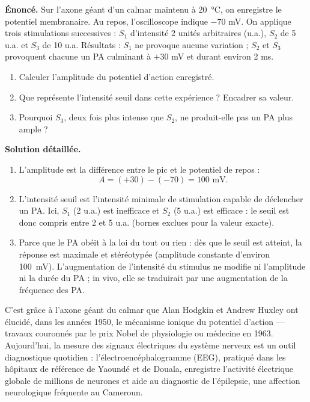\documentclass[11pt]{article}
\begin{document}
\begin{exoresolu}
\textbf{Énoncé.} Sur l'axone géant d'un calmar maintenu à \SI{20}{\celsius}, on enregistre le potentiel membranaire. Au repos, l'oscilloscope indique $-70$ mV. On applique trois stimulations successives : $S_1$ d'intensité 2 unités arbitraires (u.a.), $S_2$ de 5 u.a. et $S_3$ de 10 u.a. Résultats : $S_1$ ne provoque aucune variation ; $S_2$ et $S_3$ provoquent chacune un PA culminant à $+30$ mV et durant environ 2 ms.
\begin{enumerate}
\item Calculer l'amplitude du potentiel d'action enregistré.
\item Que représente l'intensité seuil dans cette expérience ? Encadrer sa valeur.
\item Pourquoi $S_3$, deux fois plus intense que $S_2$, ne produit-elle pas un PA plus ample ?
\end{enumerate}
\tcblower
\textbf{Solution détaillée.}
\begin{enumerate}
\item L'amplitude est la différence entre le pic et le potentiel de repos :
\[ A = (+30) - (-70) = 100 \text{ mV}. \]
\item L'intensité seuil est l'intensité minimale de stimulation capable de déclencher un PA. Ici, $S_1$ (2 u.a.) est inefficace et $S_2$ (5 u.a.) est efficace : le seuil est donc compris entre 2 et 5 u.a. (bornes exclues pour la valeur exacte).
\item Parce que le PA obéit à la loi du tout ou rien : dès que le seuil est atteint, la réponse est maximale et stéréotypée (amplitude constante d'environ \SI{100}{mV}). L'augmentation de l'intensité du stimulus ne modifie ni l'amplitude ni la durée du PA ; in vivo, elle se traduirait par une augmentation de la fréquence des PA.
\end{enumerate}
\end{exoresolu}

\begin{savaistu}
C'est grâce à l'axone géant du calmar que Alan Hodgkin et Andrew Huxley ont élucidé, dans les années 1950, le mécanisme ionique du potentiel d'action — travaux couronnés par le prix Nobel de physiologie ou médecine en 1963. Aujourd'hui, la mesure des signaux électriques du système nerveux est un outil diagnostique quotidien : l'électroencéphalogramme (EEG), pratiqué dans les hôpitaux de référence de Yaoundé et de Douala, enregistre l'activité électrique globale de millions de neurones et aide au diagnostic de l'épilepsie, une affection neurologique fréquente au Cameroun.
\end{savaistu}
\end{document}
